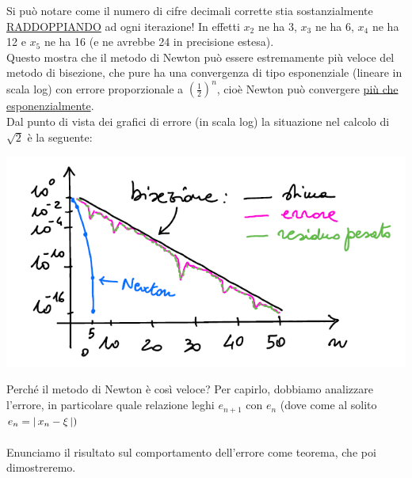 \documentclass[12pt]{article}
\DeclarePairedDelimiter{\abs}{\lvert}{\rvert}
\begin{document}
Si può notare come il numero di cifre decimali corrette stia sostanzialmente \uline{RADDOPPIANDO} ad ogni iterazione! In effetti $x_2$ ne ha 3, $x_3$ ne ha 6, $x_4$ ne ha 12 e $x_5$ ne ha 16 (e ne avrebbe 24 in precisione estesa).\\
Questo mostra che il metodo di Newton può essere estremamente più veloce del metodo di bisezione, che pure ha una convergenza di tipo esponenziale (lineare in scala log) con errore proporzionale a $\left(\frac{1}{2}\right)^n$, cioè Newton può convergere \uline{più che esponenzialmente}.\\
Dal punto di vista dei grafici di errore (in scala log) la situazione nel calcolo di $\sqrt{2}$ è la seguente:\\
\begin{center}
    \includegraphics[]{pagina25.PNG}
\end{center}
Perché il metodo di Newton è così veloce? Per capirlo, dobbiamo analizzare l'errore, in particolare quale relazione leghi $e_{n+1}$ con $e_n$ (dove come al solito $e_n=\abs{\,x_n-\xi\,})$\\\\
Enunciamo il risultato sul comportamento dell'errore come teorema, che poi dimostreremo.
\end{document}

